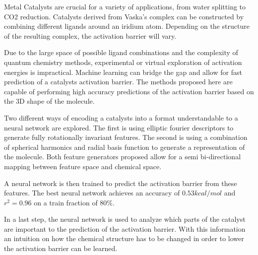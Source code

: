 
\Abstract

Metal Catalysts are crucial for a variety of applications, from water splitting to CO2 reduction. %
Catalysts derived from Vaska's complex can be constructed by combining different ligands around an iridium atom.
Depending on the structure of the resulting complex, the activation barrier will vary.


Due to the large space of possible ligand combinations and the complexity of quantum chemistry methods, experimental or virtual exploration
of activation energies is impractical.
Machine learning can bridge the gap and allow for fast prediction of a catalysts activation barrier.
The methods proposed here are capable of performing high accuracy predictions of the activation barrier based on
the 3D shape of the molecule.

Two different ways of encoding a catalysts into a format understandable to a neural network are explored.
The first is using elliptic fourier descriptors to generate fully rotationally invariant features.
The second is using a combination of spherical harmonics and radial basis function to generate a representation of the 
molecule.
Both feature generators proposed allow for a semi bi-directional mapping between feature space and chemical space.

A neural network is then trained to predict the activation barrier from these features.
The best neural network achieves an accuracy of $0.53 kcal/mol$ and $r^2 = 0.96$ on a train fraction of 80\%.

In a last step, the neural network is used to analyze which parts of the catalyst are important to the prediction of the activation barrier.
With this information an intuition on how the chemical structure has to be changed in order to lower the activation barrier can be learned.
